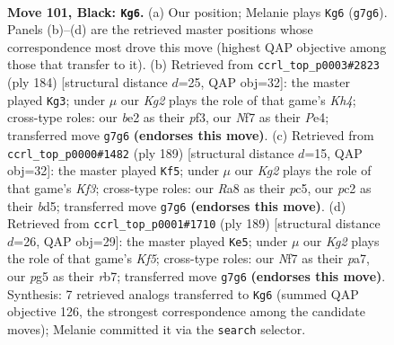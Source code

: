\documentclass[11pt]{article}
\begin{document}
\clearpage

\begin{figure}[p]\centering
\begin{subfigure}{0.46\textwidth}\centering
\resizebox{\linewidth}{!}{%
\newchessgame
\chessboard[
  setfen={r7/PR3nk1/8/6P1/8/6KP/2P1B3/8 b - - 2 101},
  showmover=false,
  pgfstyle=straightmove, color=movearrow, markmove={g7-g6}
]}
\caption{}
\end{subfigure}\hfill
\begin{subfigure}{0.46\textwidth}\centering
\resizebox{\linewidth}{!}{%
\newchessgame
\chessboard[
  setfen={2R5/6k1/3Bp3/1p2p3/4P2K/4rp2/8/8 w - - 0 93},
  showmover=false,
  pgfstyle=straightmove, color=movearrow, markmove={h4-g3}
]}
\caption{}
\end{subfigure}
\\[4pt]
\begin{subfigure}{0.46\textwidth}\centering
\resizebox{\linewidth}{!}{%
\newchessgame
\chessboard[
  setfen={6R1/5P2/5kn1/2PB4/5P2/2P5/2K5/8 b - - 2 95},
  showmover=false,
  pgfstyle=straightmove, color=movearrow, markmove={f6-f5}
]}
\caption{}
\end{subfigure}\hfill
\begin{subfigure}{0.46\textwidth}\centering
\resizebox{\linewidth}{!}{%
\newchessgame
\chessboard[
  setfen={r7/PR6/3p4/3P4/1P1n1k2/8/K7/8 b - - 0 95},
  showmover=false,
  pgfstyle=straightmove, color=movearrow, markmove={f4-e5}
]}
\caption{}
\end{subfigure}
\caption{\textbf{Move 101, Black: \texttt{Kg6}.} (a) Our position; Melanie plays \texttt{Kg6} (\texttt{g7g6}). Panels (b)--(d) are the retrieved master positions whose correspondence most drove this move (highest QAP objective among those that transfer to it). (b) Retrieved from \texttt{ccrl\_top\_p0003\#2823} (ply 184) [structural distance $d$=25, QAP obj=32]: the master played \texttt{Kg3}; under $\mu$ our \emph{Kg2} plays the role of that game's \emph{Kh4}; cross-type roles: our \emph{b}e2 as their \emph{p}f3, our \emph{N}f7 as their \emph{P}e4; transferred move \texttt{g7g6} \textbf{(endorses this move)}. (c) Retrieved from \texttt{ccrl\_top\_p0000\#1482} (ply 189) [structural distance $d$=15, QAP obj=32]: the master played \texttt{Kf5}; under $\mu$ our \emph{Kg2} plays the role of that game's \emph{Kf3}; cross-type roles: our \emph{R}a8 as their \emph{p}c5, our \emph{p}c2 as their \emph{b}d5; transferred move \texttt{g7g6} \textbf{(endorses this move)}. (d) Retrieved from \texttt{ccrl\_top\_p0001\#1710} (ply 189) [structural distance $d$=26, QAP obj=29]: the master played \texttt{Ke5}; under $\mu$ our \emph{Kg2} plays the role of that game's \emph{Kf5}; cross-type roles: our \emph{N}f7 as their \emph{p}a7, our \emph{p}g5 as their \emph{r}b7; transferred move \texttt{g7g6} \textbf{(endorses this move)}. Synthesis: 7 retrieved analogs transferred to \texttt{Kg6} (summed QAP objective 126, the strongest correspondence among the candidate moves); Melanie committed it via the \texttt{search} selector.}
\label{fig:thought-m201}
\end{figure}
\end{document}
